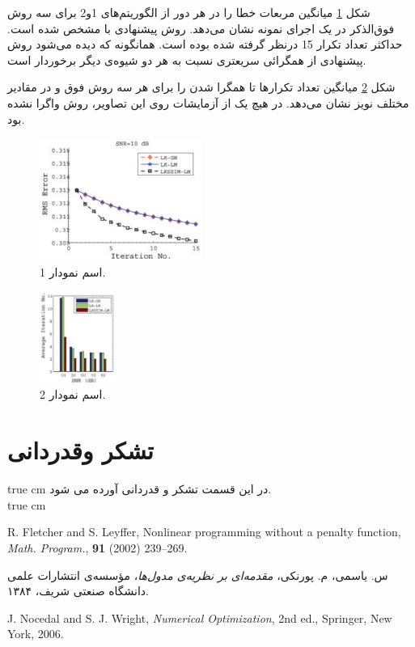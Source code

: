 \documentclass[11pt, twoside]{imsproc}
\begin{document}
شکل \ref{fig:RMS} میانگین مربعات خطا را در هر دور از الگوریتم‌های 1و2 برای سه روش فوق‌الذکر در یک اجرای نمونه نشان می‌دهد. روش پیشنهادی با  مشخص شده است. حداکثر تعداد تکرار 15 درنظر گرفته شده بوده است. همانگونه که دیده می‌شود روش پیشنهادی از همگرائی سریعتری نسبت به هر دو شیوه‌ی دیگر برخوردار است. 

شکل \ref{fig:Conv_Iter} میانگین تعداد تکرارها تا همگرا شدن را برای هر سه روش فوق و در مقادیر مختلف نویز نشان می‌دهد. در هیچ یک از آزمایشات روی این تصاویر، روش  واگرا نشده بود.

\begin{figure}[ht]
\centering 
\includegraphics*[height=40mm,width = 0.4\columnwidth]{Fig-2}
\caption{ \small اسم نمودار 1. }
\label{fig:RMS}
\end{figure}

\begin{figure}[ht]
\centering
\includegraphics*[height=30mm, width = 0.3\columnwidth]{Fig-3}
\caption{ \small اسم نمودار 2.}
\label{fig:Conv_Iter}
\end{figure}
\section{تشكر وقدردانی}
 true cm
در این قسمت تشکر و قدردانی آورده می شود.\\
 true cm

\begin{thebibliography}{99}%
\begin{LTRbibitems}
\resetlatinfont
{}
R. Fletcher and S. Leyffer, Nonlinear programming without a penalty function, \emph{Math. Program.}, \textbf{91} (2002) 239–269.

\end{LTRbibitems}
س. یاسمی، م. پورنکی، {\em مقدمه‌ای بر نظریه‌ی مدول‌ها}، مؤسسه‌ی انتشارات علمی دانشگاه صنعتی شریف، 
   ۱۳۸۴.
\begin{LTRbibitems}
\resetlatinfont
{}
J. Nocedal and S. J. Wright, \emph{Numerical Optimization}, 2nd ed., Springer, New York, 2006.
\end{LTRbibitems}
\end{thebibliography}
\bigskip
\bigskip 
\end{document}
